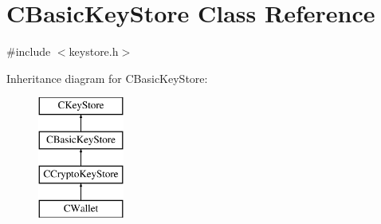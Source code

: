 \hypertarget{class_c_basic_key_store}{}\section{C\+Basic\+Key\+Store Class Reference}
\label{class_c_basic_key_store}


{\ttfamily \#include $<$keystore.\+h$>$}

Inheritance diagram for C\+Basic\+Key\+Store\+:\begin{figure}[H]
\begin{center}
\leavevmode
\includegraphics[height=4.000000cm]{class_c_basic_key_store}
\end{center}
\end{figure}
